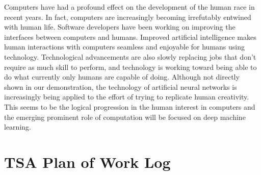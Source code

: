 \documentclass[letterpaper, 10pt]{article}
\begin{document}
	Computers have had a profound effect on the development of the human race in recent years. In fact, computers are increasingly becoming irrefutably entwined with human life. Software developers have been working on improving the interfaces between computers and humans. Improved artificial intelligence makes human interactions with computers seamless and enjoyable for humans using technology. Technological advancements are also slowly replacing jobs that don't require as much skill to perform, and technology is working toward being able to do what currently only humans are capable of doing. Although not directly shown in our demonstration, the technology of artificial neural networks is increasingly being applied to the effort of trying to replicate human creativity. This seems to be the logical progression in the human interest in computers and the emerging prominent role of computation will be focused on deep machine learning.
	

\cleardoublepage
\section{TSA Plan of Work Log}
	
\end{document}
